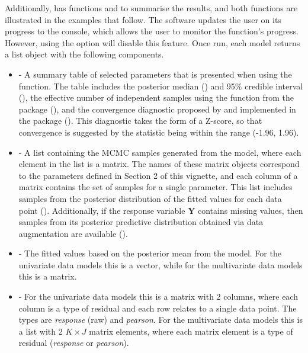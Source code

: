 \documentclass[article,shortnames,nojss]{jss}
\begin{document}
Additionally,  has functions  and  to summarise the results, and both functions are illustrated in the examples that follow. The software updates the user on its progress to the  console, which allows the user to monitor the function's progress. However, using the  option will disable this feature. Once run, each model returns a list object with the following components. 


\begin{itemize}
\item {} - A summary table of selected parameters that is presented when using the  function. The table includes the posterior median () and 95$\%$ credible interval (), the effective number of independent samples using the   function from the  package (), and the convergence  diagnostic proposed by \cite{geweke1992} and implemented in the  package (). This diagnostic takes the form of a Z-score, so that convergence is suggested by the statistic being within the range (-1.96, 1.96).

\item {} - A list containing the MCMC samples generated from the model, where each element in the list is a matrix. The names of these matrix objects correspond to the parameters defined in Section 2 of this vignette, and each column of a matrix contains the set of samples for a single parameter. This list includes samples from the posterior distribution of the fitted values for each data point (). Additionally, if the response variable $\mathbf{Y}$ contains missing values, then samples from its posterior predictive distribution obtained via data augmentation are available ().

\item {} - The fitted values based on the posterior mean from the model. For the univariate data models this is a vector, while for the multivariate data models this is a matrix.

\item {} - For the univariate data models this is a matrix with 2 columns, where each column is a type of residual and each row relates to a single data point. The types are \emph{response} (raw) and \emph{pearson}. For the multivariate data models this is a list with 2 $K\times J$ matrix elements, where each matrix element is a type of residual (\emph{response} or \emph{pearson}). 


\end{itemize}
\end{document}
